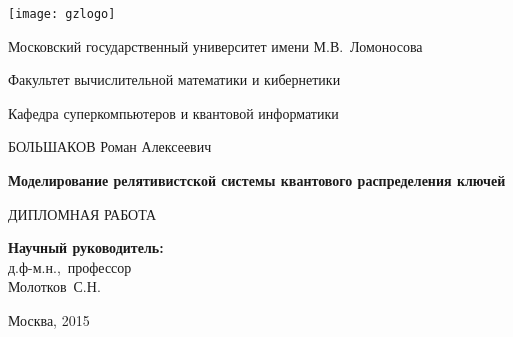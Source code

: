 \begin{titlepage}
\small{
    \centerline{\texttt{[image: gzlogo]}}
    \centerline{Московский государственный университет имени М.В.~Ломоносова}
    \centerline{Факультет вычислительной математики и кибернетики}
    \centerline{Кафедра суперкомпьютеров и квантовой информатики}
  }
\centerline{\hfill\hrulefill\hrulefill\hfill}
\vfill
\vfill
\vfill
\large
\centerline{\MakeUppercase{Большаков} Роман Алексеевич}
\vfill
\Large
\begin{center}
{\bf{Моделирование релятивистской системы квантового распределения ключей}}
\end{center}
\normalsize
\vfill
\vfill
\centerline{\MakeUppercase{Дипломная работа}}
\vfill
\vfill
\begin{flushright}
\textbf{Научный руководитель:}\\
д.ф-м.н.,~профессор\\
Молотков~С.Н.
\end{flushright}
\vfill
\vfill
\centerline{Москва, 2015}
\end{titlepage}

